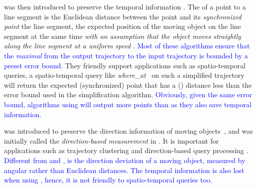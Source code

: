 { \sed was then introduced to preserve the temporal information \cite{Meratnia:Spatiotemporal,Cao:Spatio}. 
The \sed of a point to a line segment is the Euclidean distance between the point and its \emph{synchronized point} \wrt the line segment, the expected position of the moving object on the line segment at the same time \emph{with an assumption that the object moves straightly along the line segment at a uniform speed} \cite{Cao:Spatio}. \textcolor{blue}{Most of these algorithms ensure that the \emph{maximal} \sed from the output trajectory to the input trajectory is bounded by a preset \sed error bound.} 
They friendly support applications such as spatio-temporal queries, \ie a spatio-temporal query like \emph{where\_at}~\cite{Cao:Spatio} on such a simplified trajectory will return the expected (synchronized) point that has a (\sed) distance less than the error bound used in the simplification algorithm.
\textcolor{blue}{Obviously, given the same error bound, algorithms using \sed will output more points than \ped as they also save temporal information.}
%



\dad was introduced to preserve the direction information of moving objects~\cite{Long:Direction, Zhang:Evaluation}, and was initially called the \emph{direction-based measurement} in \cite{Long:Direction}. 
It is important for applications such as trajectory clustering and direction-based query processing \cite{Long:Direction,Long:Mining}.
\textcolor{blue}{Different from \ped and \sed, \dad is the direction deviation of a moving object, measured by angular rather than Euclidean distances.}
\textcolor{blue}{The temporal information is also lost when using \dad, hence, it is not friendly to spatio-temporal queries too.}



}
